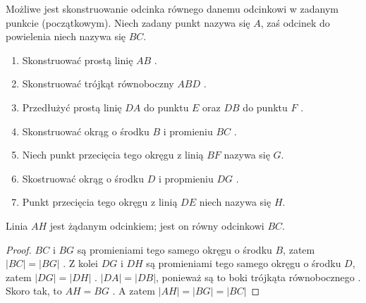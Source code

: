 \documentclass[12pt, a4paper]{scrartcl}
\begin{document}
\begin{theorem}

Możliwe jest skonstruowanie odcinka równego danemu odcinkowi w zadanym punkcie
(początkowym). Niech zadany punkt nazywa się \(A\), zaś odcinek do powielenia
niech nazywa się \(BC\).

\begin{enumerate}
    \item Skonstruować prostą linię \(AB\) .
    \item Skonstruować trójkąt równoboczny \(ABD\) .
    \item Przedłużyć prostą linię \(DA\) do punktu \(E\) oraz \(DB\) do punktu \(F\)
        .
    \item Skonstruować okrąg o środku \(B\) i promieniu \(BC\) .
    \item Niech punkt przecięcia tego okręgu z linią \(BF\) nazywa się \(G\).
    \item Skostruować okrąg o środku \(D\) i propmieniu \(DG\) .
    \item Punkt przecięcia tego okręgu z linią \(DE\) niech nazywa się \(H\).
\end{enumerate}

Linia \(AH\) jest żądanym odcinkiem; jest on równy odcinkowi \(BC\).

\pagebreak
\begin{figure}[h!]
    \begin{center}
    \end{center}
\end{figure}

\begin{proof}
    \(BC\) i \(BG\) są promieniami tego samego okręgu o środku \(B\), zatem
    \(|BC| = |BG|\) . Z kolei \(DG\) i \(DH\) są promieniami tego
    samego okręgu o środku \(D\), zatem \(|DG| = |DH|\) . \(|DA| =
    |DB|\), ponieważ są to boki trójkąta równobocznego . Skoro tak,
    to \(AH = BG\) . A zatem \(|AH| = |BG| = |BC|\) 
\end{proof}
\end{theorem}
\end{document}
